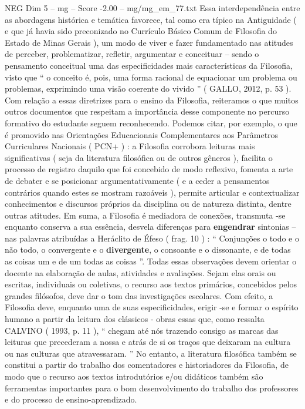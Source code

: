 \begin{textsample}{NEG Dim 5 – mg – Score -2.00 – mg/mg\_em\_77.txt}
Essa interdependência entre as abordagens histórica e temática favorece, tal como era típico na Antiguidade ( e que já havia sido preconizado no Currículo Básico Comum de Filosofia do Estado de Minas Gerais ), um modo de viver e fazer fundamentado nas atitudes de perceber, problematizar, refletir, argumentar e conceituar – sendo o pensamento conceitual uma das especificidades mais características da Filosofia, visto que “ o conceito é, pois, uma forma racional de equacionar um problema ou problemas, exprimindo uma visão coerente do vivido ” ( GALLO, 2012, p. 53 ).
Com relação a essas diretrizes para o ensino da Filosofia, reiteramos o que muitos outros documentos que respeitam a importância desse componente no percurso formativo do estudante seguem reconhecendo.
Podemos citar, por exemplo, o que é promovido nas Orientações Educacionais Complementares aos Parâmetros Curriculares Nacionais ( PCN+ ) : a Filosofia corrobora leituras mais significativas ( seja da literatura filosófica ou de outros gêneros ), facilita o processo de registro daquilo que foi concebido de modo reflexivo, fomenta a arte de debater e se posicionar argumentativamente ( e a ceder a pensamentos contrários quando estes se mostram razoáveis ), permite articular e contextualizar conhecimentos e discursos próprios da disciplina ou de natureza distinta, dentre outras atitudes.
Em suma, a Filosofia é mediadora de conexões, transmuta -se enquanto conserva a sua essência, desvela diferenças para \textbf{engendrar} sintonias – nas palavras atribuídas a Heráclito de Éfeso ( frag. 10 ) : “ Conjunções o todo e o não todo, o convergente e o \textbf{divergente}, o consoante e o dissonante, e de todas as coisas um e de um todas as coisas ”.
Todas essas observações devem orientar o docente na elaboração de aulas, atividades e avaliações.
Sejam elas orais ou escritas, individuais ou coletivas, o recurso aos textos primários, concebidos pelos grandes filósofos, deve dar o tom das investigações escolares.
Com efeito, a Filosofia deve, enquanto uma de suas especificidades, erigir -se e formar o espírito humano a partir da leitura dos clássicos - obras essas que, como ressalta CALVINO ( 1993, p. 11 ), “ chegam até nós trazendo consigo as marcas das leituras que precederam a nossa e atrás de si os traços que deixaram na cultura ou nas culturas que atravessaram. ” No entanto, a literatura filosófica também se constitui a partir do trabalho dos comentadores e historiadores da Filosofia, de modo que o recurso aos textos introdutórios e/ou didáticos também são ferramentas importantes para o bom desenvolvimento do trabalho dos professores e do processo de ensino-aprendizado.

\end{textsample}
